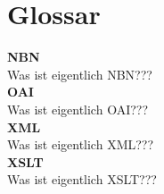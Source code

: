 %
%
\chapter*{Glossar}
{\bf NBN} \\[1.5ex]
Was ist eigentlich NBN??? \\[2ex]
{\bf OAI} \\[1.5ex]
Was ist eigentlich OAI??? \\[2ex]
{\bf XML} \\[1.5ex]
Was ist eigentlich XML??? \\[2ex]
{\bf XSLT} \\[1.5ex]
Was ist eigentlich XSLT??? \\[2ex]
%
%
